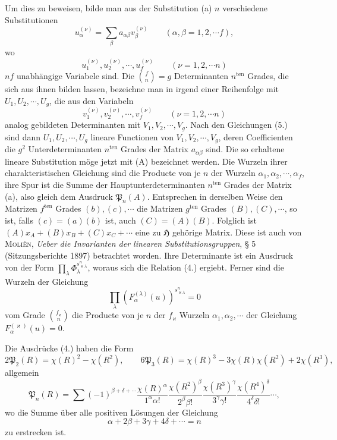 \documentclass[11pt]{article}
\newcommand{\Hgr}{\mathfrak{H}}
\newcommand{\FrobP}{\mathfrak{P}}
\newcommand{\ten}{\mathrm{ten}}
\begin{document}
Um dies zu beweisen, bilde man aus der Substitution (a) $n$ verschiedene Substitutionen
\begin{equation*}\tag{5.}
u_\alpha^{(\nu)}=\sum_\beta a_{\alpha\beta}v_\beta^{(\nu)}
\qquad(\alpha,\beta=1,2,\cdots f),
\end{equation*}
wo
\[
u_1^{(\nu)},u_2^{(\nu)},\cdots,u_f^{(\nu)}
\qquad(\nu=1,2,\cdots n)
\]
$nf$ unabhängige Variabele sind. Die $\binom{f}{n}=g$ Determinanten $n^{\ten}$ Grades, die sich aus ihnen bilden lassen, bezeichne man in irgend einer Reihenfolge mit $U_1,U_2,\cdots,U_g$, die aus den Variabeln
\[
v_1^{(\nu)},v_2^{(\nu)},\cdots,v_f^{(\nu)}
\qquad(\nu=1,2,\cdots n)
\]
analog gebildeten Determinanten mit $V_1,V_2,\cdots,V_g$. Nach den Gleichungen (5.) sind dann $U_1,U_2,\cdots,U_g$ lineare Functionen von $V_1,V_2,\cdots,V_g$, deren Coefficienten die $g^2$ Unterdeterminanten $n^{\ten}$ Grades der Matrix $a_{\alpha\beta}$ sind. Die so erhaltene lineare Substitution möge jetzt mit (A) bezeichnet werden. Die Wurzeln ihrer charakteristischen Gleichung sind die Producte von je $n$ der Wurzeln $\alpha_1,\alpha_2,\cdots,\alpha_f$, ihre Spur ist die Summe der Hauptunterdeterminanten $n^{\ten}$ Grades der Matrix (a), also gleich dem Ausdruck $\FrobP_n(A)$. Entsprechen in derselben Weise den Matrizen $f^{\ten}$ Grades $(b),(c),\cdots$ die Matrizen $g^{\ten}$ Grades $(B),(C),\cdots$, so ist, falls $(c)=(a)(b)$ ist, auch $(C)=(A)(B)$. Folglich ist $(A)x_A+(B)x_B+(C)x_C+\cdots$ eine zu $\Hgr$ gehörige Matrix. Diese ist auch von \textsc{Moliên}, \emph{Ueber die Invarianten der linearen Substitutionsgruppen}, § 5 (Sitzungsberichte 1897) betrachtet worden. Ihre Determinante ist ein Ausdruck von der Form $\prod_\lambda\Phi_\lambda^{s_{\varkappa\lambda}^{n}}$, woraus sich die Relation (4.) ergiebt. Ferner sind die Wurzeln der Gleichung
\[
\prod_\lambda\left(F_\alpha^{(\lambda)}(u)\right)^{s_{\varkappa\lambda}^{n}}=0
\]
vom Grade $\binom{f_\varkappa}{n}$ die Producte von je $n$ der $f_\varkappa$ Wurzeln $\alpha_1,\alpha_2,\cdots$ der Gleichung $F_\alpha^{(\varkappa)}(u)=0$.

Die Ausdrücke (4.) haben die Form
\begin{equation*}\tag{6.}
2\FrobP_2(R)=\chi(R)^2-\chi(R^2),\qquad
6\FrobP_3(R)=\chi(R)^3-3\chi(R)\chi(R^2)+2\chi(R^3),
\end{equation*}
allgemein
\begin{equation*}\tag{7.}
\FrobP_n(R)=\sum (-1)^{\beta+\delta+\cdots}
\frac{\chi(R)^\alpha}{1^\alpha\alpha!}
\frac{\chi(R^2)^\beta}{2^\beta\beta!}
\frac{\chi(R^3)^\gamma}{3^\gamma\gamma!}
\frac{\chi(R^4)^\delta}{4^\delta\delta!}\cdots,
\end{equation*}
wo die Summe über alle positiven Lösungen der Gleichung
\begin{equation*}\tag{8.}
\alpha+2\beta+3\gamma+4\delta+\cdots=n
\end{equation*}
zu erstrecken ist.
\end{document}
